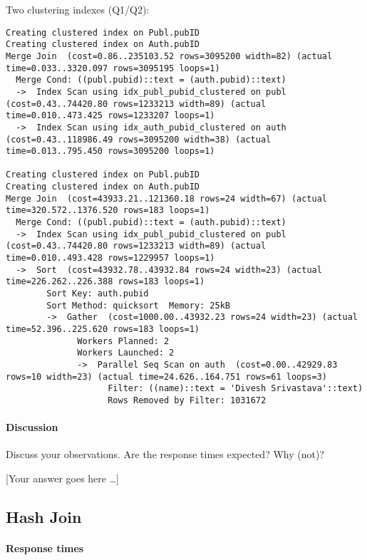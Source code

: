 \documentclass[11pt]{scrartcl}
\newcommand{\youranswerhere}{[Your answer goes here \ldots]}
\begin{document}
Two clustering indexes  (Q1/Q2):
{\small
\parskip0pt\begin{verbatim}
Creating clustered index on Publ.pubID
Creating clustered index on Auth.pubID
Merge Join  (cost=0.86..235103.52 rows=3095200 width=82) (actual time=0.033..3320.097 rows=3095195 loops=1)
  Merge Cond: ((publ.pubid)::text = (auth.pubid)::text)
  ->  Index Scan using idx_publ_pubid_clustered on publ  (cost=0.43..74420.80 rows=1233213 width=89) (actual time=0.010..473.425 rows=1233207 loops=1)
  ->  Index Scan using idx_auth_pubid_clustered on auth  (cost=0.43..118986.49 rows=3095200 width=38) (actual time=0.013..795.450 rows=3095200 loops=1)

Creating clustered index on Publ.pubID
Creating clustered index on Auth.pubID
Merge Join  (cost=43933.21..121360.18 rows=24 width=67) (actual time=320.572..1376.520 rows=183 loops=1)
  Merge Cond: ((publ.pubid)::text = (auth.pubid)::text)
  ->  Index Scan using idx_publ_pubid_clustered on publ  (cost=0.43..74420.80 rows=1233213 width=89) (actual time=0.010..493.428 rows=1229957 loops=1)
  ->  Sort  (cost=43932.78..43932.84 rows=24 width=23) (actual time=226.262..226.388 rows=183 loops=1)
        Sort Key: auth.pubid
        Sort Method: quicksort  Memory: 25kB
        ->  Gather  (cost=1000.00..43932.23 rows=24 width=23) (actual time=52.396..225.620 rows=183 loops=1)
              Workers Planned: 2
              Workers Launched: 2
              ->  Parallel Seq Scan on auth  (cost=0.00..42929.83 rows=10 width=23) (actual time=24.626..164.751 rows=61 loops=3)
                    Filter: ((name)::text = 'Divesh Srivastava'::text)
                    Rows Removed by Filter: 1031672
\end{verbatim}}

\paragraph{Discussion}

Discuss your observations. Are the response times expected? Why (not)?

\youranswerhere{}

\subsection*{Hash Join}

\paragraph{Response times}\mbox{}
\end{document}
